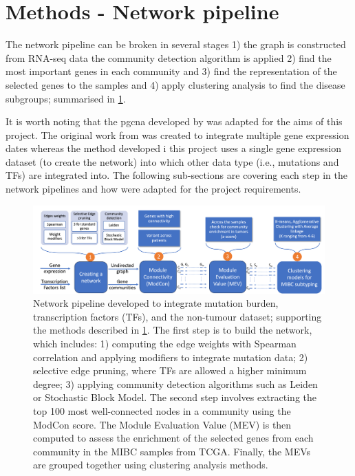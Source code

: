 \section{Methods - Network pipeline} \label{s:N_I:methods}

The network pipeline can be broken in several stages 1) the graph is constructed from RNA-seq data the community detection algorithm is applied 2) find the most important genes in each community and 3) find the representation of the selected genes to the samples and 4) apply clustering analysis to find the disease subgroups; summarised in \cref{fig:N_I:network_pipeline}.

It is worth noting that the \acrfull{pgcna} developed by \citet{Care2019-ij} was adapted for the aims of this project. The original work from \citep{Care2019-ij} was created to integrate multiple gene expression dates whereas the method developed i this project uses a single gene expression dataset (to create the network) into which other data type (i.e., mutations and TFs) are integrated into. The following sub-sections are covering each step in the network pipelines and how were adapted for the project requirements.

\begin{figure}
    \centering
    \includegraphics[width=1.0\textwidth,keepaspectratio]{Sections/Network_I/Resources/Methods/network_pipeline.png}
    \caption[The integrative network pipeline]{Network pipeline developed to integrate mutation burden, transcription factors (TFs), and the non-tumour dataset; supporting the methods described in \cref{s:N_I:methods}. The first step is to build the network, which includes: 1) computing the edge weights with Spearman correlation and applying modifiers to integrate mutation data; 2) selective edge pruning, where TFs are allowed a higher minimum degree; 3) applying community detection algorithms such as Leiden or Stochastic Block Model. The second step involves extracting the top 100 most well-connected nodes in a community using the ModCon score. The Module Evaluation Value (MEV) is then computed to assess the enrichment of the selected genes from each community in the MIBC samples from TCGA. Finally, the MEVs are grouped together using clustering analysis methods.}
    \hfill
    \label{fig:N_I:network_pipeline}
\end{figure}

